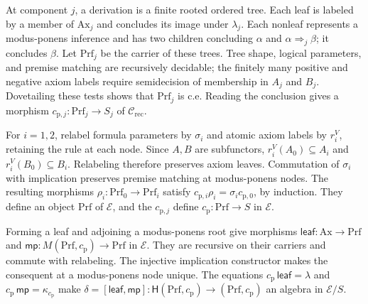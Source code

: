 At component $j$, a derivation is a finite rooted ordered tree.
Each leaf is labeled by a member of $\mathrm{Ax}_j$ and concludes
its image under $\lambda_j$. Each nonleaf represents a modus-ponens
inference and has two children concluding $\alpha$ and
$\alpha\Rightarrow_j\beta$; it concludes $\beta$. Let
$\mathrm{Prf}_j$ be the carrier of these trees. Tree shape, logical
parameters, and premise matching are recursively decidable; the
finitely many positive and negative axiom labels require semidecision
of membership in $A_j$ and $B_j$. Dovetailing these tests shows that
$\mathrm{Prf}_j$ is c.e. Reading the conclusion gives a morphism
$c_{\mathrm p,j}:\mathrm{Prf}_j\to S_j$ of $\mathcal C_{\mathrm{rec}}$.

For $i=1,2$, relabel formula parameters by $\sigma_i$ and atomic
axiom labels by $r_i^V$, retaining the rule at each node. Since $A,B$ are
subfunctors, $r_i^V(A_0)\subseteq A_i$ and
$r_i^V(B_0)\subseteq B_i$. Relabeling therefore preserves axiom
leaves. Commutation of $\sigma_i$ with implication preserves premise
matching at modus-ponens nodes. The resulting morphisms
$\rho_i:\mathrm{Prf}_0\to\mathrm{Prf}_i$ satisfy
$c_{\mathrm p,i}\rho_i=\sigma_i c_{\mathrm p,0}$, by induction. They define an object
$\mathrm{Prf}$ of $\mathcal E$, and the $c_{\mathrm p,j}$ define
$c_{\mathrm p}:\mathrm{Prf}\to S$ in $\mathcal E$.

Forming a leaf and adjoining a modus-ponens root give morphisms
$\mathsf{leaf}:\mathrm{Ax}\to\mathrm{Prf}$ and
$\mathsf{mp}:M(\mathrm{Prf},c_{\mathrm p})\to\mathrm{Prf}$ in $\mathcal E$.
They are recursive on their carriers and commute with relabeling.
The injective implication constructor makes the consequent at a
modus-ponens node unique. The equations
$c_{\mathrm p}\,\mathsf{leaf}=\lambda$ and $c_{\mathrm p}\,\mathsf{mp}=\kappa_{c_{\mathrm p}}$ make
$\delta=[\mathsf{leaf},\mathsf{mp}]:\mathsf H(\mathrm{Prf},c_{\mathrm p})\to(\mathrm{Prf},c_{\mathrm p})$
an algebra in $\mathcal E/S$.

